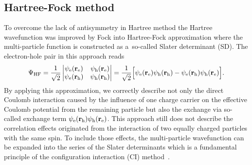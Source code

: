 \subsection{Hartree-Fock method}
To overcome the lack of antisymmetry in Hartree method the Hartree wavefunction was improved by Fock into Hartree-Fock approximation where the multi-particle function is constructed as a~so-called Slater determinant (SD). The electron-hole pair in this approach reads 
%
\begin{equation}
\Psi_\mathrm{HF}=\frac{1}{\sqrt{2}}\begin{vmatrix}
\psi_{\rm{e}}(\mathbf{r}_{\rm{e}})&\psi_{\rm{h}}(\mathbf{r}_{\rm{e}})\\
\psi_{\rm{e}}(\mathbf{r}_{\rm{h}})&\psi_{\rm{h}}(\mathbf{r}_{\rm{h}})\\
\end{vmatrix}=\frac{1}{\sqrt{2}}\Big[\psi_{\rm{e}}(\mathbf{r}_{\rm{e}})\psi_{\rm{h}}(\mathbf{r}_{\rm{h}})-\psi_{\rm{e}}(\mathbf{r}_{\rm{h}})\psi_{\rm{h}}(\mathbf{r}_{\rm{e}})\Big].
\end{equation}
%
By applying this approximation, we correctly describe not only the direct Coulomb interaction caused by the influence of one charge carrier on the effective Coulomb potential from the remaining particle but also the exchange via so-called exchange term $\psi_{\rm{e}}(\mathbf{r}_{\rm{h}}) \psi_{\rm{h}}(\mathbf{r}_{\rm{e}})$. This approach still does not describe the correlation effects originated from the interaction of two equally charged particles with the same spin. To include those effects, the multi-particle wavefunction can be expanded into the series of the Slater determinants which is a fundamental principle of the configuration interaction (CI) method~\citep{t_stier}.

